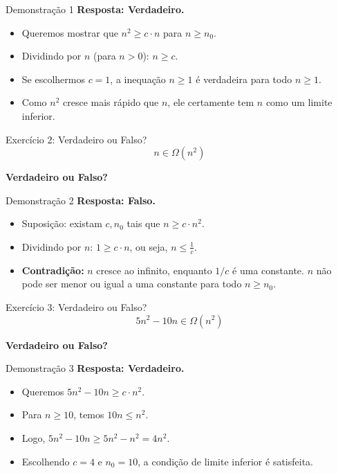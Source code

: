 \documentclass[aspectratio=169]{beamer}
\begin{document}
\begin{frame}{Demonstração 1}
    \textbf{Resposta: Verdadeiro.}
    \begin{itemize}
        \item Queremos mostrar que $n^2 \ge c \cdot n$ para $n \ge n_0$.
        \item Dividindo por $n$ (para $n > 0$): $n \ge c$.
        \item Se escolhermos $c = 1$, a inequação $n \ge 1$ é verdadeira para todo $n \ge 1$.
        \item Como $n^2$ cresce mais rápido que $n$, ele certamente tem $n$ como um limite inferior.
    \end{itemize}
\end{frame}


\begin{frame}{Exercício 2: Verdadeiro ou Falso?}
    \Large
    \[ n \in \Omega(n^2) \]
    \begin{center}
        \textbf{Verdadeiro ou Falso?}
    \end{center}
\end{frame}

\begin{frame}{Demonstração 2}
    \textbf{Resposta: Falso.}
    \begin{itemize}
        \item Suposição: existam $c, n_0$ tais que $n \ge c \cdot n^2$.
        \item Dividindo por $n$: $1 \ge c \cdot n$, ou seja, $n \le \frac{1}{c}$.
        \item \textbf{Contradição:} $n$ cresce ao infinito, enquanto $1/c$ é uma constante. $n$ não pode ser menor ou igual a uma constante para todo $n \ge n_0$.
    \end{itemize}
\end{frame}

\begin{frame}{Exercício 3: Verdadeiro ou Falso?}
    \Large
    \[ 5n^2 - 10n \in \Omega(n^2) \]
    \begin{center}
        \textbf{Verdadeiro ou Falso?}
    \end{center}
\end{frame}

\begin{frame}{Demonstração 3}
    \textbf{Resposta: Verdadeiro.}
    \begin{itemize}
        \item Queremos $5n^2 - 10n \ge c \cdot n^2$.
        \item Para $n \ge 10$, temos $10n \le n^2$. 
        \item Logo, $5n^2 - 10n \ge 5n^2 - n^2 = 4n^2$.
        \item Escolhendo $c = 4$ e $n_0 = 10$, a condição de limite inferior é satisfeita.
    \end{itemize}
\end{frame}
\end{document}

